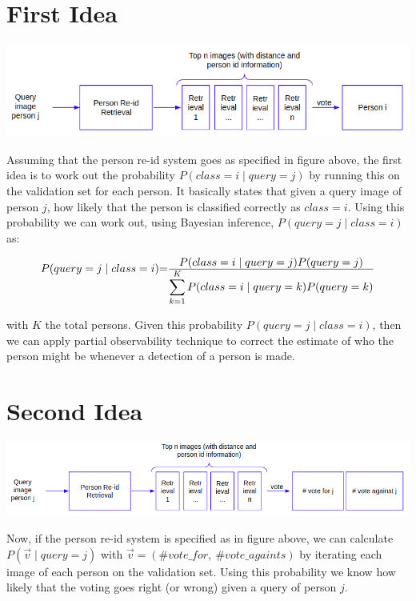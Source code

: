 \documentclass[10pt,a4paper,final]{article}
\begin{document}
\section{First Idea}

\includegraphics[width=\textwidth]{figures/first_idea.png}

Assuming that the person re-id system goes as specified in figure above, the first idea is to work out the probability $P(class = i \mid query = j)$ by running this on the validation set for each person. It basically states that given a query image of person $j$, how likely that the person is classified correctly as $class = i$. Using this probability we can work out, using Bayesian inference, $P(query=j \mid class=i)$ as:

\begin{equation}
	\label{eq:first_idea}
	\begin{tabular}{r@{=}l}
		$P(query=j \mid class=i)$ & $\frac{\displaystyle P(class = i \mid query = j) P(query=j)}{\displaystyle\sum_{k=1}^{K} P(class = i \mid query = k) P(query=k)}$ \\ 
	\end{tabular}
\end{equation}

\noindent with $K$ the total persons. Given this probability $P(query=j \mid class=i)$, then we can apply partial observability technique to correct the estimate of who the person might be whenever a detection of a person is made.

\section{Second Idea}

\includegraphics[width=\textwidth]{figures/second_idea.png}

Now, if the person re-id system is specified as in figure above, we can calculate $P(\overrightarrow{v} \mid query = j)$ with $\overrightarrow{v} = (\#vote\_for, ~\#vote\_againts)$ by iterating each image of each person on the validation set. Using this probability we know how likely that the voting goes right (or wrong) given a query of person $j$.
\end{document}
